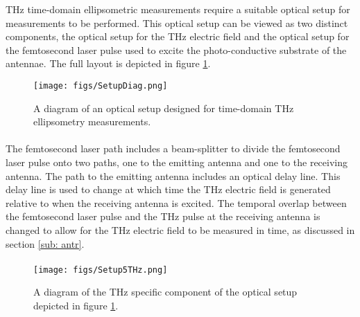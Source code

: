 THz time-domain ellipsometric measurements require a suitable optical setup for measurements to be performed. This optical setup can be viewed as two distinct components, the optical setup for the THz electric field and the optical setup for the femtosecond laser pulse used to excite the photo-conductive substrate of the antennae. The full layout is depicted in figure \ref{fig:SetDiag}.

\begin{figure}[H]
\begin{center}
	 \texttt{[image: figs/SetupDiag.png]}
	 \caption[Full optical setup diagram]{A diagram of an optical setup designed for time-domain THz ellipsometry measurements.}
   \label{fig:SetDiag}
\end{center}
\end{figure}

\paragraph{}
The femtosecond laser path includes a beam-splitter to divide the femtosecond laser pulse onto two paths, one to the emitting antenna and one to the receiving antenna. The path to the emitting antenna includes an optical delay line. This delay line is used to change at which time the THz electric field is generated relative to when the receiving antenna is excited. The temporal overlap between the femtosecond laser pulse and the THz pulse at the receiving antenna is changed to allow for the THz electric field to be measured in time, as discussed in section \ref{sub: antr}.
\paragraph{}

\begin{figure}[H]
\begin{center}
	 \texttt{[image: figs/Setup5THz.png]}
	 \caption[Terahertz optical setup diagram]{A diagram of the THz specific component of the optical setup depicted in figure \ref{fig:SetDiag}.}
   \label{fig:SetEDiag}
\end{center}
\end{figure}

